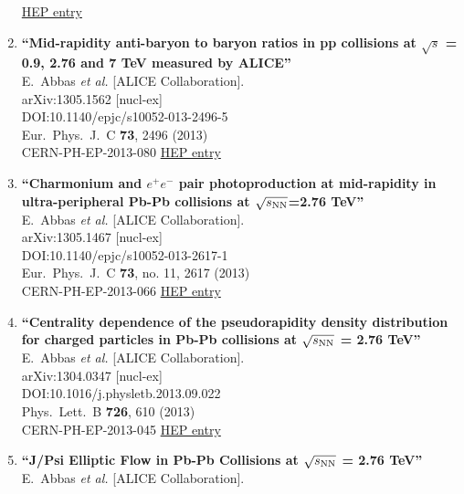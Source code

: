 \begin{enumerate}
\href{http://inspirehep.net/record/1233087}{HEP entry}
\item%
{\bf ``Mid-rapidity anti-baryon to baryon ratios in pp collisions at $\sqrt{s}$ = 0.9, 2.76 and 7 TeV measured by ALICE''}
  \\{}E.~Abbas {\it et al.} [ALICE Collaboration].
  \\{}arXiv:1305.1562 [nucl-ex]
  \\{}DOI:10.1140/epjc/s10052-013-2496-5
  \\{}Eur.\ Phys.\ J.\ C {\bf 73}, 2496 (2013)
  \\{}CERN-PH-EP-2013-080
\href{http://inspirehep.net/record/1232209}{HEP entry}
\item%
{\bf ``Charmonium and $e^+e^-$ pair photoproduction at mid-rapidity in ultra-peripheral Pb-Pb collisions at $\sqrt{s_{\rm NN}}$=2.76 TeV''}
  \\{}E.~Abbas {\it et al.} [ALICE Collaboration].
  \\{}arXiv:1305.1467 [nucl-ex]
  \\{}DOI:10.1140/epjc/s10052-013-2617-1
  \\{}Eur.\ Phys.\ J.\ C {\bf 73}, no. 11, 2617 (2013)
  \\{}CERN-PH-EP-2013-066
\href{http://inspirehep.net/record/1232206}{HEP entry}
\item%
{\bf ``Centrality dependence of the pseudorapidity density distribution for charged particles in Pb-Pb collisions at $\sqrt{s_{\rm NN}}$ = 2.76 TeV''}
  \\{}E.~Abbas {\it et al.} [ALICE Collaboration].
  \\{}arXiv:1304.0347 [nucl-ex]
  \\{}DOI:10.1016/j.physletb.2013.09.022
  \\{}Phys.\ Lett.\ B {\bf 726}, 610 (2013)
  \\{}CERN-PH-EP-2013-045
\href{http://inspirehep.net/record/1225979}{HEP entry}
\item%
{\bf ``J/Psi Elliptic Flow in Pb-Pb Collisions at $\sqrt{s_{\rm NN}}$ = 2.76 TeV''}
  \\{}E.~Abbas {\it et al.} [ALICE Collaboration].

\end{enumerate}
